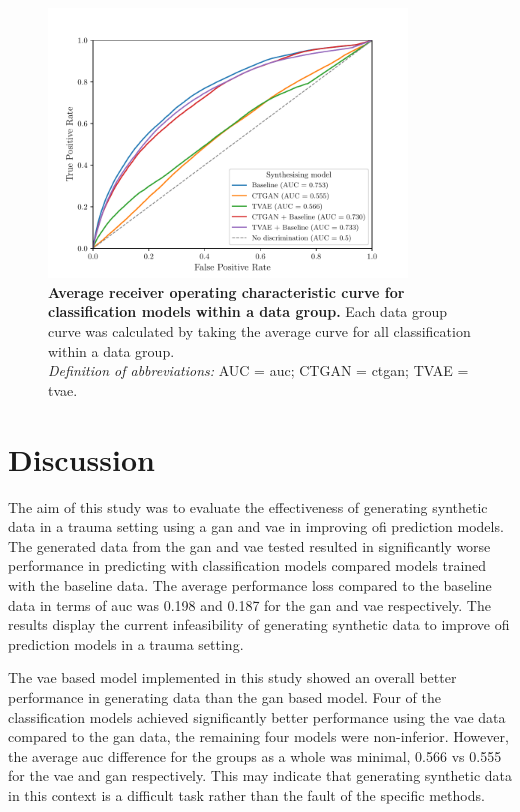 \documentclass[12pt, a4paper]{article}
\begin{document}
\begin{figure}
	\centering
	\includegraphics[width=0.85\textwidth]{figures/roc.pdf}
	\caption{\textbf{Average receiver operating characteristic curve for classification models within a data group.} Each data group curve was calculated by taking the average curve for all classification within a data group. \\
		\textit{Definition of abbreviations:} AUC = \Acrlong{auc}; CTGAN = \Acrlong{ctgan}; TVAE = \Acrlong{tvae}.}
	\label{fig:roc}
\end{figure}

\newpage

\section{Discussion}
The aim of this study was to evaluate the effectiveness of generating synthetic data in a trauma setting using a
\acrshort{gan} and \acrshort{vae} in improving \acrshort{ofi} prediction models. The generated data from the
\acrshort{gan} and \acrshort{vae} tested resulted in significantly worse performance in predicting 
with classification models compared models trained with the baseline data. The average performance loss compared to the
baseline data in terms of \acrshort{auc} was 0.198 and 0.187 for the \acrshort{gan} and \acrshort{vae} respectively.
The results display the current infeasibility of generating synthetic data to improve \acrshort{ofi} prediction models
in a trauma setting.

The \acrshort{vae} based model implemented in this study showed an overall better performance in generating data than
the \acrshort{gan} based model. Four of the classification models achieved significantly better performance using the
\acrshort{vae} data compared to the \acrshort{gan} data, the remaining four models were non-inferior. However, the
average \acrshort{auc} difference for the groups as a whole was minimal, 0.566 vs 0.555 for the \acrshort{vae} and
\acrshort{gan} respectively. This may indicate that generating synthetic data in this context is a difficult task
rather than the fault of the specific methods.
\end{document}
